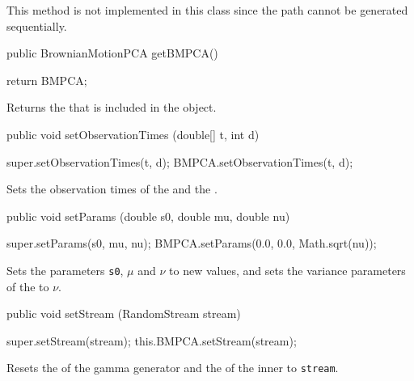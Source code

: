 \begin{tabb} This method is not implemented in this class since the path
cannot be generated sequentially.
\end{tabb}
\begin{code}

   public BrownianMotionPCA getBMPCA() \begin{hide} {
        return BMPCA;
    }
\end{hide}
\end{code}
\begin{tabb} Returns the  that is included in the
 object.
\end{tabb}
\begin{code}

   public void setObservationTimes (double[] t, int d)\begin{hide} {
        super.setObservationTimes(t, d);
        BMPCA.setObservationTimes(t, d);
    }\end{hide}
\end{code}
\begin{tabb} Sets the observation times of the  and the
.
\end{tabb}
\begin{code}

   public void setParams (double s0, double mu, double nu)\begin{hide} {
        super.setParams(s0, mu, nu);
        BMPCA.setParams(0.0, 0.0, Math.sqrt(nu));
    }\end{hide}
\end{code}
\begin{tabb} Sets the parameters \texttt{s0}, $\mu$ and $\nu$ to new values, and sets
the variance parameters of the  to $\nu$.
\end{tabb}
\begin{code}

   public void setStream (RandomStream stream) \begin{hide} {
        super.setStream(stream);
        this.BMPCA.setStream(stream);
}\end{hide}
\end{code}
\begin{tabb}
Resets the 
of the gamma generator and the
 of
the inner  to
\texttt{stream}.
\end{tabb}
\begin{code}\begin{hide}
}
\end{hide}
\end{code}
